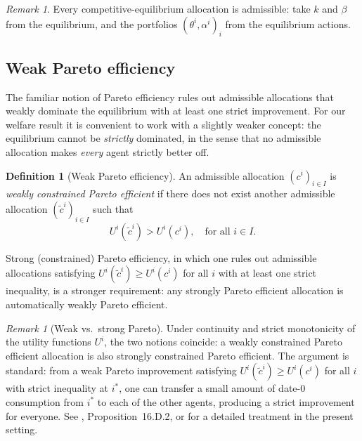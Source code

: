 \documentclass[11pt,a4paper,oneside]{book}
\def\geq{\geqslant}
\theoremstyle{plain}
\theoremstyle{definition}
\newtheorem{definition}[theorem]{Definition}
\theoremstyle{remark}
\newtheorem{remark}[theorem]{Remark}
\numberwithin{equation}{chapter}
\begin{document}
\begin{remark}\label{rem:eq-is-admissible}
Every competitive-equilibrium allocation is admissible: take $k$ and $\beta$ from the equilibrium, and the portfolios $(\theta^i, \alpha^i)_i$ from the equilibrium actions.
\end{remark}

\subsection{Weak Pareto efficiency}

The familiar notion of Pareto efficiency rules out admissible allocations that weakly dominate the equilibrium with at least one strict improvement.
For our welfare result it is convenient to work with a slightly weaker concept: the equilibrium cannot be \emph{strictly} dominated, in the sense that no admissible allocation makes \emph{every} agent strictly better off.

\begin{definition}[Weak Pareto efficiency]\label{def:weak-pareto-BGR}
An admissible allocation $(c^i)_{i \in I}$ is \emph{weakly constrained Pareto efficient} if there does not exist another admissible allocation $(\widetilde{c}^i)_{i \in I}$ such that
\begin{equation*}
  U^i(\widetilde{c}^i) > U^i(c^i), \quad \text{for all $i \in I$.}
\end{equation*}
\end{definition}

Strong (constrained) Pareto efficiency, in which one rules out admissible allocations satisfying $U^i(\widetilde{c}^i) \geq U^i(c^i)$ for all $i$ with at least one strict inequality, is a stronger requirement: any strongly Pareto efficient allocation is automatically weakly Pareto efficient.

\begin{remark}[Weak vs.\ strong Pareto]\label{rem:weak-vs-strong}
Under continuity and strict monotonicity of the utility functions $U^i$, the two notions coincide: a weakly constrained Pareto efficient allocation is also strongly constrained Pareto efficient.
The argument is standard: from a weak Pareto improvement satisfying $U^i(\widetilde{c}^i) \geq U^i(c^i)$ for all $i$ with strict inequality at $i^\ast$, one can transfer a small amount of date-$0$ consumption from $i^\ast$ to each of the other agents, producing a strict improvement for everyone.
See \citet{Mas-Colell-Whinston-Green-1995}, Proposition~16.D.2, or \cite{BisinGottardiRuta2015} for a detailed treatment in the present setting.
\end{remark}
\end{document}
